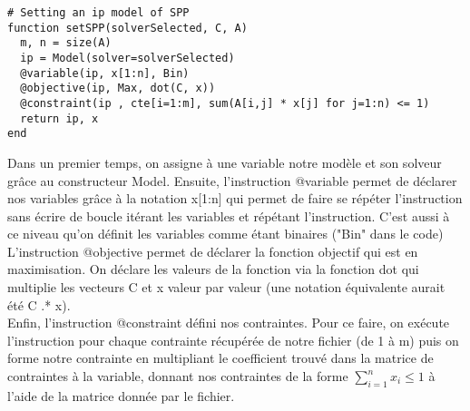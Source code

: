 \documentclass[ a4paper,10pt]{article}
\begin{document}
%
%

\vspace{5mm}
\noindent
{}
\vspace{2mm}

\noindent

\begin{lstlisting}[frame=single]
# Setting an ip model of SPP
function setSPP(solverSelected, C, A)
  m, n = size(A)
  ip = Model(solver=solverSelected)
  @variable(ip, x[1:n], Bin)
  @objective(ip, Max, dot(C, x))
  @constraint(ip , cte[i=1:m], sum(A[i,j] * x[j] for j=1:n) <= 1)
  return ip, x
end
\end{lstlisting}

Dans un premier temps, on assigne à une variable notre modèle et son solveur grâce au constructeur Model. Ensuite, l'instruction @variable permet de déclarer nos variables grâce à la notation x[1:n] qui permet de faire se répéter l'instruction sans écrire de boucle itérant les variables et répétant l'instruction. C'est aussi à ce niveau qu'on définit les variables comme étant binaires ("Bin" dans le code) \\ 

L'instruction @objective permet de déclarer la fonction objectif qui est en maximisation. On déclare les valeurs de la fonction via la fonction dot qui multiplie les vecteurs C et x valeur par valeur (une notation équivalente aurait été C .* x). \\

Enfin, l'instruction @constraint défini nos contraintes. Pour ce faire, on exécute l'instruction pour chaque contrainte récupérée de notre fichier (de 1 à m) puis on forme notre contrainte en multipliant le coefficient trouvé dans la matrice de contraintes à la variable, donnant nos contraintes de la forme $\sum_{i=1}^{n} x_i \leq 1 $ à l'aide de la matrice donnée par le fichier.




%
%
\end{document}

